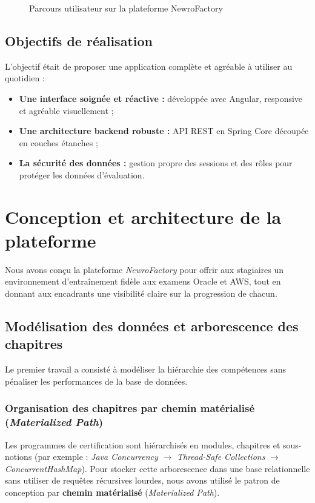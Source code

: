 \documentclass{tnreport}
\begin{document}
\begin{figure}[htbp]
\caption{Parcours utilisateur sur la plateforme NewroFactory}
\label{fig:workflow_parcours_quiz}
\end{figure}

\subsection{Objectifs de réalisation}
\label{subsec:objectifs_contraintes}

L'objectif était de proposer une application complète et agréable à utiliser au quotidien :
\begin{itemize}
    \item \textbf{Une interface soignée et réactive :} développée avec Angular, responsive et agréable visuellement ;
    \item \textbf{Une architecture backend robuste :} API REST en Spring Core découpée en couches étanches ;
    \item \textbf{La sécurité des données :} gestion propre des sessions et des rôles pour protéger les données d'évaluation.
\end{itemize}

\section{Conception et architecture de la plateforme}
\label{sec:conception_systeme}

Nous avons conçu la plateforme \textit{NewroFactory} pour offrir aux stagiaires un environnement d'entraînement fidèle aux examens Oracle et AWS, tout en donnant aux encadrants une visibilité claire sur la progression de chacun.

\subsection{Modélisation des données et arborescence des chapitres}
\label{subsec:modelisation_domaine}

Le premier travail a consisté à modéliser la hiérarchie des compétences sans pénaliser les performances de la base de données.

\subsubsection{Organisation des chapitres par chemin matérialisé (\textit{Materialized Path})}
Les programmes de certification sont hiérarchisés en modules, chapitres et sous-notions (par exemple : \textit{Java Concurrency} $\rightarrow$ \textit{Thread-Safe Collections} $\rightarrow$ \textit{ConcurrentHashMap}). Pour stocker cette arborescence dans une base relationnelle sans utiliser de requêtes récursives lourdes, nous avons utilisé le patron de conception par \textbf{chemin matérialisé} (\textit{Materialized Path}).
\end{document}
